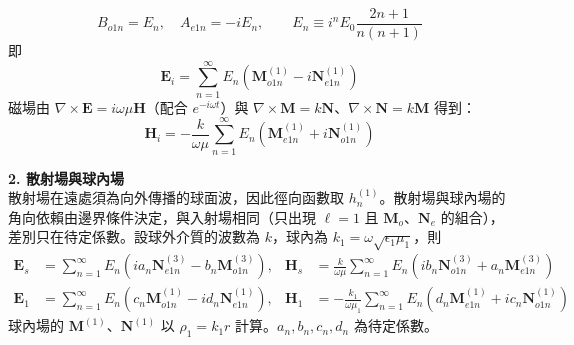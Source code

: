 \begin{equation}
    B_{o1n} = E_n, \quad A_{e1n} = -i E_n, \qquad E_n \equiv i^n E_0 \frac{2n+1}{n(n+1)}
\end{equation}
即
\begin{equation}
    \mathbf{E}_i = \sum_{n=1}^{\infty} E_n \left( \mathbf{M}^{(1)}_{o1n} - i \mathbf{N}^{(1)}_{e1n} \right)
\end{equation}
磁場由 $\nabla \times \mathbf{E} = i\omega\mu \mathbf{H}$（配合 $e^{-i\omega t}$）與 $\nabla \times \mathbf{M} = k\mathbf{N}$、$\nabla \times \mathbf{N} = k\mathbf{M}$ 得到：
\begin{equation}
    \mathbf{H}_i = -\frac{k}{\omega\mu} \sum_{n=1}^{\infty} E_n \left( \mathbf{M}^{(1)}_{e1n} + i \mathbf{N}^{(1)}_{o1n} \right)
\end{equation}

\textbf{2. 散射場與球內場}\\
散射場在遠處須為向外傳播的球面波，因此徑向函數取 $h_n^{(1)}$。散射場與球內場的角向依賴由邊界條件決定，與入射場相同（只出現 $\ell = 1$ 且 $\mathbf{M}_o$、$\mathbf{N}_e$ 的組合），差別只在待定係數。設球外介質的波數為 $k$，球內為 $k_1 = \omega\sqrt{\epsilon_1\mu_1}$，則
\begin{align}
    \mathbf{E}_s &= \sum_{n=1}^{\infty} E_n \left( i a_n \mathbf{N}^{(3)}_{e1n} - b_n \mathbf{M}^{(3)}_{o1n} \right), & \mathbf{H}_s &= \frac{k}{\omega\mu} \sum_{n=1}^{\infty} E_n \left( i b_n \mathbf{N}^{(3)}_{o1n} + a_n \mathbf{M}^{(3)}_{e1n} \right) \\
    \mathbf{E}_1 &= \sum_{n=1}^{\infty} E_n \left( c_n \mathbf{M}^{(1)}_{o1n} - i d_n \mathbf{N}^{(1)}_{e1n} \right), & \mathbf{H}_1 &= -\frac{k_1}{\omega\mu_1} \sum_{n=1}^{\infty} E_n \left( d_n \mathbf{M}^{(1)}_{e1n} + i c_n \mathbf{N}^{(1)}_{o1n} \right)
\end{align}
球內場的 $\mathbf{M}^{(1)}$、$\mathbf{N}^{(1)}$ 以 $\rho_1 = k_1 r$ 計算。$a_n, b_n, c_n, d_n$ 為待定係數。

